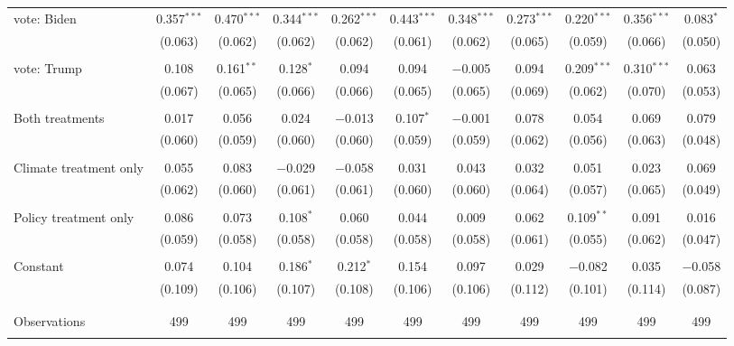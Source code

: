 \begin{tabular}{@{\extracolsep{5pt}}lcccccccccc}
 vote: Biden & 0.357$^{***}$ & 0.470$^{***}$ & 0.344$^{***}$ & 0.262$^{***}$ & 0.443$^{***}$ & 0.348$^{***}$ & 0.273$^{***}$ & 0.220$^{***}$ & 0.356$^{***}$ & 0.083$^{*}$ \\ 
  & (0.063) & (0.062) & (0.062) & (0.062) & (0.061) & (0.062) & (0.065) & (0.059) & (0.066) & (0.050) \\ 
  & & & & & & & & & & \\ 
 vote: Trump & 0.108 & 0.161$^{**}$ & 0.128$^{*}$ & 0.094 & 0.094 & $-$0.005 & 0.094 & 0.209$^{***}$ & 0.310$^{***}$ & 0.063 \\ 
  & (0.067) & (0.065) & (0.066) & (0.066) & (0.065) & (0.065) & (0.069) & (0.062) & (0.070) & (0.053) \\ 
  & & & & & & & & & & \\ 
 Both treatments & 0.017 & 0.056 & 0.024 & $-$0.013 & 0.107$^{*}$ & $-$0.001 & 0.078 & 0.054 & 0.069 & 0.079 \\ 
  & (0.060) & (0.059) & (0.060) & (0.060) & (0.059) & (0.059) & (0.062) & (0.056) & (0.063) & (0.048) \\ 
  & & & & & & & & & & \\ 
 Climate treatment only & 0.055 & 0.083 & $-$0.029 & $-$0.058 & 0.031 & 0.043 & 0.032 & 0.051 & 0.023 & 0.069 \\ 
  & (0.062) & (0.060) & (0.061) & (0.061) & (0.060) & (0.060) & (0.064) & (0.057) & (0.065) & (0.049) \\ 
  & & & & & & & & & & \\ 
 Policy treatment only & 0.086 & 0.073 & 0.108$^{*}$ & 0.060 & 0.044 & 0.009 & 0.062 & 0.109$^{**}$ & 0.091 & 0.016 \\ 
  & (0.059) & (0.058) & (0.058) & (0.058) & (0.058) & (0.058) & (0.061) & (0.055) & (0.062) & (0.047) \\ 
  & & & & & & & & & & \\ 
 Constant & 0.074 & 0.104 & 0.186$^{*}$ & 0.212$^{*}$ & 0.154 & 0.097 & 0.029 & $-$0.082 & 0.035 & $-$0.058 \\ 
  & (0.109) & (0.106) & (0.107) & (0.108) & (0.106) & (0.106) & (0.112) & (0.101) & (0.114) & (0.087) \\ 
  & & & & & & & & & & \\ 
\hline \\[-1.8ex] 

Observations & 499 & 499 & 499 & 499 & 499 & 499 & 499 & 499 & 499 & 499 \\ 
\hline 
\hline \\[-1.8ex] 
\end{tabular} 
